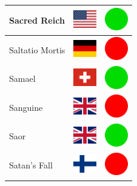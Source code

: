 \documentclass[12pt, a4paper, twoside]{report}
\begin{document}
\begin{center}
\begin{longtable}{|p{5cm}|p{2cm}|p{2cm}|}
 Sacred Reich                                               & \includegraphics[width=1cm]{4x3/us} &   \includegraphics[width=1cm]{likes/y} \\ \hline
 Saltatio Mortis                                            & \includegraphics[width=1cm]{4x3/de} &   \includegraphics[width=1cm]{likes/n} \\ \hline
 Samael                                                     & \includegraphics[width=1cm]{4x3/ch} &   \includegraphics[width=1cm]{likes/y} \\ \hline
 Sanguine                                                   & \includegraphics[width=1cm]{4x3/gb} &   \includegraphics[width=1cm]{likes/n} \\ \hline
 Saor                                                       & \includegraphics[width=1cm]{4x3/gb} &   \includegraphics[width=1cm]{likes/y} \\ \hline
 Satan's Fall                                               & \includegraphics[width=1cm]{4x3/fi} &   \includegraphics[width=1cm]{likes/n} \\ \hline

\end{longtable}
\end{center}
\end{document}
